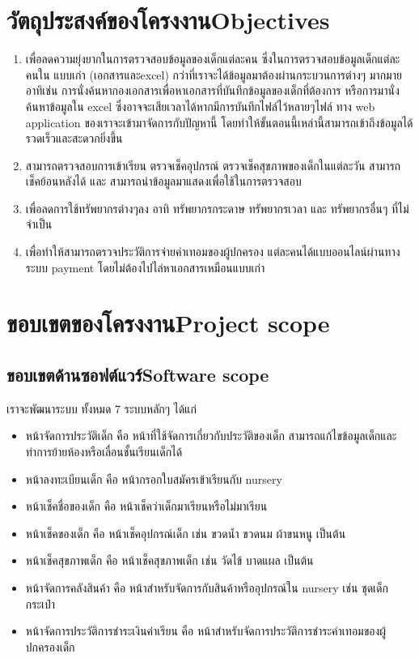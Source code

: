 \section{\ifcpe วัตถุประสงค์ของโครงงาน\else Objectives\fi}
\begin{enumerate}
    \item เพื่อลดความยุ่งยากในการตรวจสอบข้อมูลของเด็กแต่ละคน ซึ่งในการตรวจสอบข้อมูลเด็กแต่ละคนใน แบบเก่า (เอกสารและexcel) กว่าที่เราจะได้ข้อมูลมาต้องผ่านกระบวนการต่างๆ มากมาย อาทิเช่น การนั่งค้นหากองเอกสารเพื่อหาเอกสารที่บันทึกข้อมูลของเด็กที่ต้องการ หรือการมานั่งค้นหาข้อมูลใน excel ซึ่งอาจจะเสียเวลาได้หากมีการบันทึกไฟล์ไว้หลายๆไฟล์ ทาง web application ของเราจะเข้ามาจัดการกับปัญหานี้ โดยทําให้ขั้นตอนนี้เหล่านี้สามารถเข้าถึงข้อมูลได้รวดเร็วและสะดวกยิ่งขึ้น 

    \item สามารถตรวจสอบการเข้าเรียน ตรวจเช็คอุปกรณ์ ตรวจเช็คสุขภาพของเด็กในแต่ละวัน   สามารถเช็คย้อนหลังได้ และ สามารถนําข้อมูลมาแสดงเพื่อใช้ในการตรวจสอบ

    \item เพื่อลดการใช้ทรัพยากรต่างๆลง อาทิ ทรัพยากรกระดาษ ทรัพยากรเวลา และ ทรัพยากรอื่นๆ ที่ไม่จําเป็น
    \item เพื่อทำให้สามารถตรวจประวัติการจ่ายค่าเทอมของผู้ปกครอง แต่ละคนได้แบบออนไลน์ผ่านทางระบบ payment โดยไม่ต้องไปไล่หาเอกสารเหมือนแบบเก่า

\end{enumerate}


\section{\ifcpe ขอบเขตของโครงงาน\else Project scope\fi}




\subsection{\ifcpe ขอบเขตด้านซอฟต์แวร์\else Software scope\fi}
    เราจะพัฒนาระบบ ทั้งหมด 7 ระบบหลักๆ ได้แก่
    \begin{itemize}
        \item หน้าจัดการประวัติเด็ก คือ หน้าที่ใช้จัดการเกี่ยวกับประวัติของเด็ก สามารถแก้ไขข้อมูลเด็กและทำการย้ายห้องหรือเลื่อนชั้นเรียนเด็กได้
        \item หน้าลงทะเบียนเด็ก คือ หน้ากรอกใบสมัครเข้าเรียนกับ nursery
        \item หน้าเช็คชื่อของเด็ก คือ หน้าเช็คว่าเด็กมาเรียนหรือไม่มาเรียน
        \item หน้าเช็คของเด็ก คือ หน้าเช็คอุปกรณ์เด็ก เช่น ขวดน้ำ ขวดนม ผ้าขนหนู เป็นต้น
        \item หน้าเช็คสุขภาพเด็ก คือ หน้าเช็คสุขภาพเด็ก เช่น วัดไข้ บาดแผล เป็นต้น
        \item หน้าจัดการคลังสินค้า คือ หน้าสำหรับจัดการกับสินค้าหรืออุปกรณ์ใน nursery เช่น ชุดเด็ก กระเป๋า 
        \item หน้าจัดการประวัติการชำระเงินค่าเรียน คือ หน้าสำหรับจัดการประวัติการชำระค่าเทอมของผู้ปกครองเด็ก
    \end{itemize}

